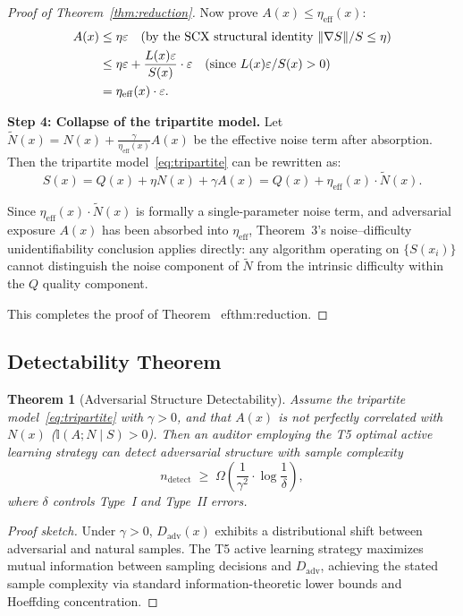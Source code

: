 \documentclass[12pt,a4paper]{article}
\newtheorem{theorem}{Theorem}[section]
\newcommand{\I}{\mathbb{I}}
\newcommand{\eff}{\mathrm{eff}}
\begin{document}
\begin{proof}[Proof of Theorem~\ref{thm:reduction}]
Now prove $A(x) \leq \eta_{\eff}(x)$:
\begin{align}
A(x) &\leq \eta \varepsilon \quad\text{(by the SCX structural identity $\|\nabla S\|/S \leq \eta$)} \notag \\
     &\leq \eta \varepsilon + \frac{L(x) \varepsilon}{S(x)} \cdot \varepsilon
        \quad\text{(since $L(x)\varepsilon/S(x) > 0$)} \notag \\
     &= \eta_{\eff}(x) \cdot \varepsilon. \label{eq:abs-absorption}
\end{align}

\textbf{Step 4: Collapse of the tripartite model.}
Let $\widetilde{N}(x) = N(x) + \frac{\gamma}{\eta_{\eff}(x)} A(x)$ be the effective noise term after absorption.
Then the tripartite model~\eqref{eq:tripartite} can be rewritten as:
\[
S(x) = Q(x) + \eta N(x) + \gamma A(x)
     = Q(x) + \eta_{\eff}(x) \cdot \widetilde{N}(x).
\]

Since $\eta_{\eff}(x) \cdot \widetilde{N}(x)$ is formally a single-parameter noise term, and adversarial exposure $A(x)$ has been absorbed into $\eta_{\eff}$, Theorem~3's noise--difficulty unidentifiability conclusion applies directly: any algorithm operating on $\{S(x_i)\}$ cannot distinguish the noise component of $\widetilde{N}$ from the intrinsic difficulty within the $Q$ quality component.

This completes the proof of Theorem~
ef{thm:reduction}.
\end{proof}

\subsection{Detectability Theorem}

\begin{theorem}[Adversarial Structure Detectability]
\label{thm:detectability}
Assume the tripartite model~\eqref{eq:tripartite} with $\gamma > 0$, and
that $A(x)$ is not perfectly correlated with $N(x)$
($\I(A; N \mid S) > 0$).  Then an auditor employing the T5 optimal active
learning strategy can detect adversarial structure with sample complexity
\begin{equation}\label{eq:sample-complexity}
    n_{\mathrm{detect}}
    \;\geq\; \Omega\!\left(\frac{1}{\gamma^2} \cdot
    \log\frac{1}{\delta}\right),
\end{equation}
where $\delta$ controls Type~I and Type~II errors.
\end{theorem}

\begin{proof}[Proof sketch]
Under $\gamma > 0$, $D_{\mathrm{adv}}(x)$ exhibits a distributional shift between adversarial and natural samples. The T5 active learning strategy maximizes mutual information between sampling decisions and $D_{\mathrm{adv}}$, achieving the stated sample complexity via standard information-theoretic lower bounds and Hoeffding concentration.
\end{proof}
\end{document}
